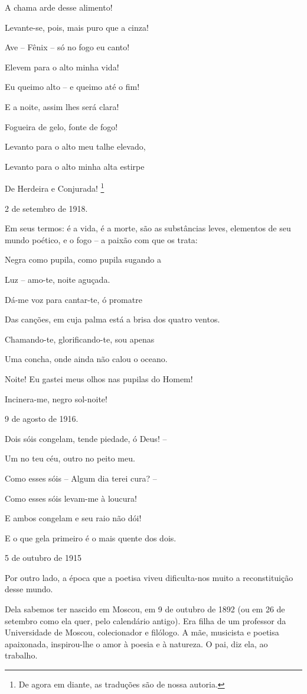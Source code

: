 A chama arde desse alimento!

Levante-se, pois, mais puro que a cinza!

Ave -- Fênix -- só no fogo eu canto!

Elevem para o alto minha vida!

Eu queimo alto -- e queimo até o fim!

E a noite, assim lhes será clara!

Fogueira de gelo, fonte de fogo!

Levanto para o alto meu talhe elevado,

Levanto para o alto minha alta estirpe

De Herdeira e Conjurada! \footnote{De agora em diante, as traduções são
  de nossa autoria.}

2 de setembro de 1918.

Em seus termos: é a vida, é a morte, são as substâncias leves, elementos
de seu mundo poético, e o fogo -- a paixão com que os trata:

Negra como pupila, como pupila sugando a

Luz -- amo-te, noite aguçada.

Dá-me voz para cantar-te, ó promatre

Das canções, em cuja palma está a brisa dos quatro ventos.

Chamando-te, glorificando-te, sou apenas

Uma concha, onde ainda não calou o oceano.

Noite! Eu gastei meus olhos nas pupilas do Homem!

Incinera-me, negro sol-noite!

9 de agosto de 1916.

Dois sóis congelam, tende piedade, ó Deus! --

Um no teu céu, outro no peito meu.

Como esses sóis -- Algum dia terei cura? --

Como esses sóis levam-me à loucura!

E ambos congelam e seu raio não dói!

E o que gela primeiro é o mais quente dos dois.

5 de outubro de 1915

Por outro lado, a época que a poetisa viveu dificulta-nos muito a
reconstituição desse mundo.

Dela sabemos ter nascido em Moscou, em 9 de outubro de 1892 (ou em 26 de
setembro como ela quer, pelo calendário antigo). Era filha de um
professor da Universidade de Moscou, colecionador e filólogo. A mãe,
musicista e poetisa apaixonada, inspirou-lhe o amor à poesia e à
natureza. O pai, diz ela, ao trabalho.

